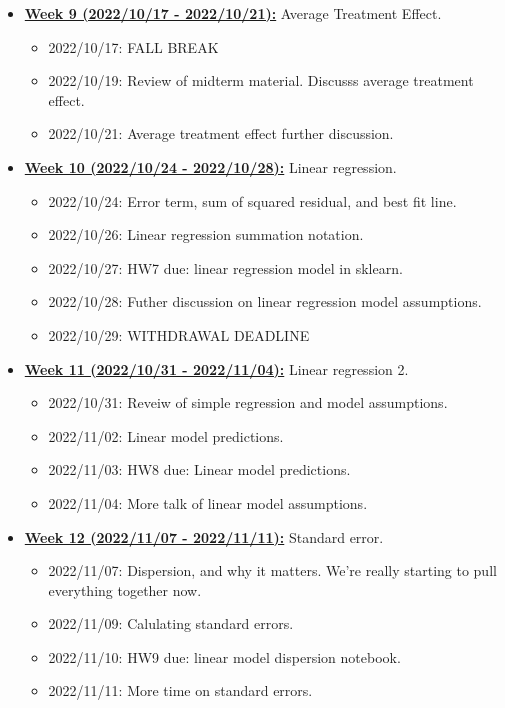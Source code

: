 \documentclass[11pt]{article}
\begin{document}
\begin{itemize}
  \item \underline{\textbf{Week 9 (2022/10/17 - 2022/10/21):}} Average Treatment Effect.
  \begin{itemize}
    \item 2022/10/17: FALL BREAK 
    \item 2022/10/19: Review of midterm material. Discusss average treatment effect. 
    \item 2022/10/21: Average treatment effect further discussion. 
  \end{itemize}

  \item \underline{\textbf{Week 10 (2022/10/24 - 2022/10/28):}} Linear regression. 
  \begin{itemize}
    \item 2022/10/24: Error term, sum of squared residual, and best fit line. 
    \item 2022/10/26: Linear regression summation notation. 
    \item 2022/10/27: HW7 due: linear regression model in sklearn.
    \item 2022/10/28: Futher discussion on linear regression model assumptions. 
    \item 2022/10/29: WITHDRAWAL DEADLINE
  \end{itemize}


  \item \underline{\textbf{Week 11 (2022/10/31 - 2022/11/04):}} Linear regression 2. 
  \begin{itemize}
    \item 2022/10/31: Reveiw of simple regression and model assumptions.
    \item 2022/11/02: Linear model predictions.
    \item 2022/11/03: HW8 due: Linear model predictions. 
    \item 2022/11/04: More talk of linear model assumptions. 
  \end{itemize}


  \item \underline{\textbf{Week 12 (2022/11/07 - 2022/11/11):}} Standard error. 
  \begin{itemize}
    \item 2022/11/07: Dispersion, and why it matters. We're really starting to pull everything together now.
    \item 2022/11/09: Calulating standard errors. 
    \item 2022/11/10: HW9 due: linear model dispersion notebook. 
    \item 2022/11/11: More time on standard errors.
  \end{itemize}



\end{itemize}
\end{document}
